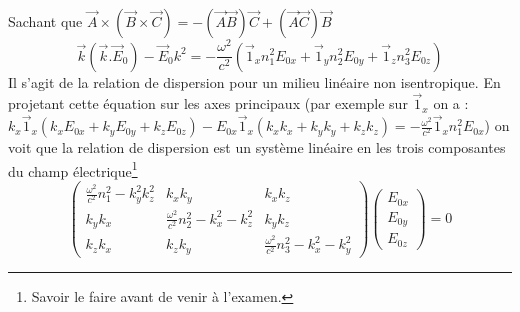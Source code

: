 Sachant que $\vec A\times(\vec B\times \vec C) = -(\vec A\vec B)\vec C+(\vec A\vec C)\vec B$ 
\begin{equation}
\vec k(\vec k . \vec E_0) - \vec E_0 k^2 = -\frac{\omega^2}{c^2}\left(\vec 1_x n_1^ 2 E_{0x}+
\vec 1_y n_2^ 2 E_{0y}+\vec 1_z n_3^ 2 E_{0z}\right)
\label{eq:4.18}
\end{equation}
Il s'agit de la relation de dispersion pour un milieu linéaire non isentropique. En projetant cette équation 
sur les axes principaux (par exemple sur $\vec 1_x$ on a : $k_x \vec 1_x \left(k_x E_{0x} + k_y E_{0y} + k_z E_{0z}\right) - E_{0x} \vec 1_x\left(k_xk_x + k_y k_y + k_z k_z\right) =
-\frac{\omega^2}{c^2} \vec 1_x n_1^2 E_{0x}$) on voit que la relation de dispersion est un système linéaire
en les trois composantes du champ électrique\footnote{Savoir le faire avant de venir à l'examen.}
\begin{equation}
\left(\begin{array}{ccc}
\frac{\omega^2}{c^2}n_1^2-k_y^2k_z^2 & k_xk_y & k_xk_z\\
k_yk_x & \frac{\omega^2}{c^2}n_2^2-k_x^2-k_z^2 & k_yk_z\\
k_zk_x & k_zk_y & \frac{\omega^2}{c^2}n_3^2-k_x^2-k_y^2
\end{array}\right)\left(\begin{array}{c}
E_{0x}\\
E_{0y}\\
E_{0z}
\end{array}\right) = 0
\label{eq:4.19}
\end{equation}



